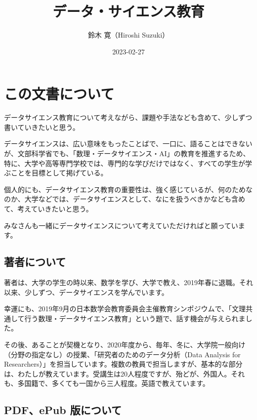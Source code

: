 \documentclass[
]{book}
\title{データ・サイエンス教育}
\author{鈴木 寛（Hiroshi Suzuki）}
\date{2023-02-27}
\theoremstyle{definition}
\theoremstyle{definition}
\theoremstyle{definition}
\theoremstyle{definition}
\theoremstyle{remark}
\begin{document}
\maketitle

{
\setcounter{tocdepth}{1}
\tableofcontents
}
\hypertarget{ux3053ux306eux6587ux66f8ux306bux3064ux3044ux3066}{%
\chapter*{この文書について}\label{ux3053ux306eux6587ux66f8ux306bux3064ux3044ux3066}}

データサイエンス教育について考えながら、課題や手法なども含めて、少しずつ書いていきたいと思う。

データサイエンスは、広い意味をもったことばで、一口に、語ることはできないが、文部科学省でも、「数理・データサイエンス・AI」の教育を推進するため、特に、大学や高等専門学校では、専門的な学びだけではなく、すべての学生が学ぶことを目標として掲げている。

個人的にも、データサイエンス教育の重要性は、強く感じているが、何のためなのか、大学などでは、データサイエンスとして、なにを扱うべきかなども含めて、考えていきたいと思う。

みなさんも一緒にデータサイエンスについて考えていただければと願っています。

\hypertarget{ux8457ux8005ux306bux3064ux3044ux3066}{%
\section*{著者について}\label{ux8457ux8005ux306bux3064ux3044ux3066}}

著者は、大学の学生の時以来、数学を学び、大学で教え、2019年春に退職。それ以来、少しずつ、データサイエンスを学んでいます。

幸運にも、2019年9月の日本数学会教育委員会主催教育シンポジウムで、「文理共通して行う数理・データサイエンス教育」という題で、話す機会が与えられました。

その後、あることが契機となり、2020年度から、毎年、冬に、大学院一般向け（分野の指定なし）の授業、「研究者のためのデータ分析（Data Analysis for Researchers）」を担当しています。複数の教員で担当しますが、基本的な部分は、わたしが教えています。受講生は20人程度ですが、殆どが、外国人。それも、多国籍で、多くても一国から三人程度。英語で教えています。

\hypertarget{pdfepub-ux7248ux306bux3064ux3044ux3066}{%
\section*{PDF、ePub 版について}\label{pdfepub-ux7248ux306bux3064ux3044ux3066}}
\end{document}
